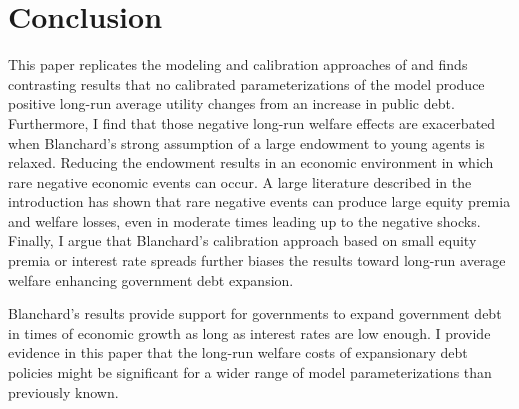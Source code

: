 \documentclass[letterpaper,12pt]{article}
\theoremstyle{definition}
\begin{document}
\section{Conclusion}\label{SecConclusion}

  This paper replicates the modeling and calibration approaches of \citet{Blanchard:2019} and finds contrasting results that no calibrated parameterizations of the model produce positive long-run average utility changes from an increase in public debt. Furthermore, I find that those negative long-run welfare effects are exacerbated when Blanchard's strong assumption of a large endowment to young agents is relaxed. Reducing the endowment results in an economic environment in which rare negative economic events can occur. A large literature described in the introduction has shown that rare negative events can produce large equity premia and welfare losses, even in moderate times leading up to the negative shocks. Finally, I argue that Blanchard's calibration approach based on small equity premia or interest rate spreads further biases the results toward long-run average welfare enhancing government debt expansion.

  Blanchard's results provide support for governments to expand government debt in times of economic growth as long as interest rates are low enough. I provide evidence in this paper that the long-run welfare costs of expansionary debt policies might be significant for a wider range of model parameterizations than previously known.

\end{document}
